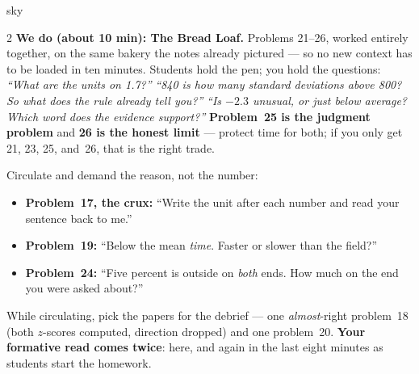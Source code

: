 \documentclass[10pt]{article}
\begin{document}
\begin{skillbox}{sky}
\begin{multicols}{2}
\textbf{We do (about 10 min): The Bread Loaf.} Problems 21--26, worked entirely together, on the
same bakery the notes already pictured --- so no new context has to be loaded in ten minutes.
Students hold the pen; you hold the questions: \emph{``What are the units on 1.7?''} \quad
\emph{``840 is how many standard deviations above 800? So what does the rule already tell you?''}
\quad \emph{``Is $-2.3$ unusual, or just below average? Which word does the evidence support?''}
\textbf{Problem~25 is the judgment problem} and \textbf{26 is the honest limit} --- protect time
for both; if you only get 21, 23, 25, and~26, that is the right trade.

Circulate and demand the reason, not the number:
\begin{itemize}[leftmargin=1.1em, nosep]
  \item \textbf{Problem~17, the crux:} ``Write the unit after each number and read your sentence
        back to me.''
  \item \textbf{Problem~19:} ``Below the mean \emph{time}. Faster or slower than the field?''
  \item \textbf{Problem~24:} ``Five percent is outside on \emph{both} ends. How much on the end
        you were asked about?''
\end{itemize}
While circulating, pick the papers for the debrief --- one \emph{almost}-right problem~18 (both
$z$-scores computed, direction dropped) and one problem~20. \textbf{Your formative read comes
twice}: here, and again in the last eight minutes as students start the homework.
\end{multicols}
\end{skillbox}
\end{document}
